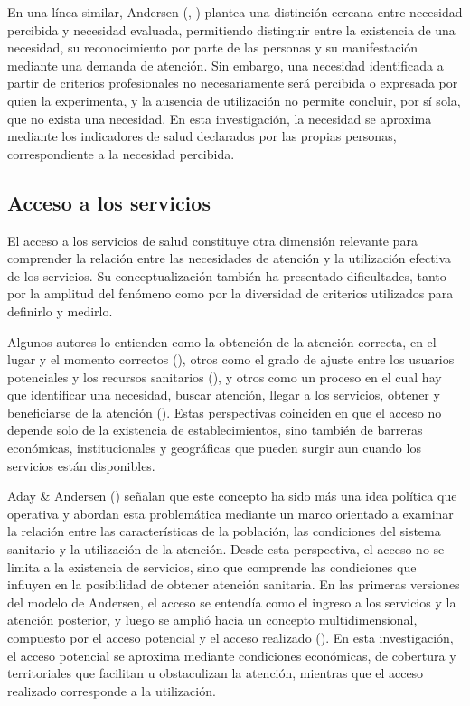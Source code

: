 \documentclass[
  spanish,
  a4paper,
  oneside]{scrbook}
\begin{document}
En una línea similar, Andersen
(,
) plantea una distinción
cercana entre necesidad percibida y necesidad evaluada, permitiendo
distinguir entre la existencia de una necesidad, su reconocimiento por
parte de las personas y su manifestación mediante una demanda de
atención. Sin embargo, una necesidad identificada a partir de criterios
profesionales no necesariamente será percibida o expresada por quien la
experimenta, y la ausencia de utilización no permite concluir, por sí
sola, que no exista una necesidad. En esta investigación, la necesidad
se aproxima mediante los indicadores de salud declarados por las propias
personas, correspondiente a la necesidad percibida.

\subsection{Acceso a los servicios}\label{acceso-a-los-servicios}

El acceso a los servicios de salud constituye otra dimensión relevante
para comprender la relación entre las necesidades de atención y la
utilización efectiva de los servicios. Su conceptualización también ha
presentado dificultades, tanto por la amplitud del fenómeno como por la
diversidad de criterios utilizados para definirlo y medirlo.

Algunos autores lo entienden como la obtención de la atención correcta,
en el lugar y el momento correctos
(), otros como el grado de ajuste entre los usuarios potenciales y
los recursos sanitarios
(), y
otros como un proceso en el cual hay que identificar una necesidad,
buscar atención, llegar a los servicios, obtener y beneficiarse de la
atención (). Estas perspectivas coinciden en que el acceso no depende solo de
la existencia de establecimientos, sino también de barreras económicas,
institucionales y geográficas que pueden surgir aun cuando los servicios
están disponibles.

Aday \& Andersen () señalan que
este concepto ha sido más una idea política que operativa y abordan esta
problemática mediante un marco orientado a examinar la relación entre
las características de la población, las condiciones del sistema
sanitario y la utilización de la atención. Desde esta perspectiva, el
acceso no se limita a la existencia de servicios, sino que comprende las
condiciones que influyen en la posibilidad de obtener atención
sanitaria. En las primeras versiones del modelo de Andersen, el acceso
se entendía como el ingreso a los servicios y la atención posterior, y
luego se amplió hacia un concepto multidimensional, compuesto por el
acceso potencial y el acceso realizado
(). En
esta investigación, el acceso potencial se aproxima mediante condiciones
económicas, de cobertura y territoriales que facilitan u obstaculizan la
atención, mientras que el acceso realizado corresponde a la utilización.
\end{document}
